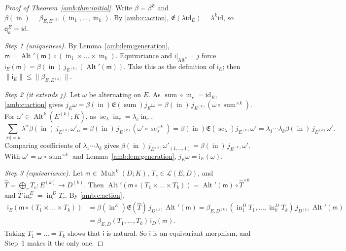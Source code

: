 \documentclass[11pt]{amsart}
\theoremstyle{definition}
\theoremstyle{remark}
\numberwithin{equation}{section}
\newcommand{\cL}{\mathcal L}
\newcommand{\Alt}{\operatorname{Alt}}
\newcommand{\Mult}{\operatorname{Mult}}
\newcommand{\id}{\mathrm{id}}
\newcommand{\abs}[1]{\lvert #1\rvert}
\newcommand{\norm}[1]{\lVert #1\rVert}
\theoremstyle{plain}
\theoremstyle{definition}
\theoremstyle{plain}
\begin{document}
\begin{proof}[Proof of Theorem~\ref{amb:thm:initial}]
Write $\beta=\beta^{\mathfrak E}$ and $\beta(\operatorname{in})=\beta_{E,E^{(k)}}(\operatorname{in}_1,\dots,\operatorname{in}_k)$. By \eqref{amb:c:action}, $\mathfrak E(\lambda\id_E)=\lambda^k\id$, so $\mathsf q_k^E=\id$.

\emph{Step 1 (uniqueness).} By Lemma~\ref{amb:lem:generation}, $\mathsf m=\operatorname{Alt}'(\mathsf m)\circ(\operatorname{in}_1\times\dots\times\operatorname{in}_k)$. Equivariance and $\mathsf i|_{\Alt^k}=j$ force $\mathsf i_E(\mathsf m)=\beta(\operatorname{in})\,j_{E^{(k)}}(\operatorname{Alt}'(\mathsf m))$. Take this as the definition of $\mathsf i_E$; then $\norm{\mathsf i_E}\le\norm{\beta_{E,E^{(k)}}}$.

\emph{Step 2 (it extends $j$).} Let $\omega$ be alternating on $E$. As $\operatorname{sum}\circ\operatorname{in}_c=\id_E$, \eqref{amb:c:action} gives $j_E\omega=\beta(\operatorname{in})\mathfrak E(\operatorname{sum})j_E\omega=\beta(\operatorname{in})\,j_{E^{(k)}}(\omega\circ\operatorname{sum}^{\times k})$. For $\omega'\in\Alt^k(E^{(k)};K)$, as $\operatorname{sc}_\lambda\operatorname{in}_c=\lambda_c\operatorname{in}_c$,
\[
 \sum_{\abs\alpha=k}\lambda^\alpha\beta(\operatorname{in})\,j_{E^{(k)}}\omega'_\alpha=\beta(\operatorname{in})\,j_{E^{(k)}}(\omega'\circ\operatorname{sc}_\lambda^{\times k})=\beta(\operatorname{in})\mathfrak E(\operatorname{sc}_\lambda)j_{E^{(k)}}\omega'=\lambda_1\cdots\lambda_k\beta(\operatorname{in})\,j_{E^{(k)}}\omega'.
\]
Comparing coefficients of $\lambda_1\cdots\lambda_k$ gives $\beta(\operatorname{in})\,j_{E^{(k)}}\omega'_{(1,\dots,1)}=\beta(\operatorname{in})\,j_{E^{(k)}}\omega'$. With $\omega'=\omega\circ\operatorname{sum}^{\times k}$ and Lemma~\ref{amb:lem:generation}, $j_E\omega=\mathsf i_E(\omega)$.

\emph{Step 3 (equivariance).} Let $\mathsf m\in\Mult^k(D;K)$, $T_c\in\cL(E,D)$, and $\widehat T=\bigoplus_cT_c\colon E^{(k)}\to D^{(k)}$. Then $\operatorname{Alt}'(\mathsf m\circ(T_1\times\dots\times T_k))=\operatorname{Alt}'(\mathsf m)\circ\widehat T^{\times k}$ and $\widehat T\operatorname{in}_c^E=\operatorname{in}_c^DT_c$. By \eqref{amb:c:action},
\begin{align*}
 \mathsf i_E(\mathsf m\circ(T_1\times\dots\times T_k))&=\beta(\operatorname{in}^E)\mathfrak E(\widehat T)\,j_{D^{(k)}}\operatorname{Alt}'(\mathsf m)=\beta_{E,D^{(k)}}(\operatorname{in}^D_1T_1,\dots,\operatorname{in}^D_kT_k)\,j_{D^{(k)}}\operatorname{Alt}'(\mathsf m)\\
 &=\beta_{E,D}(T_1,\dots,T_k)\,\mathsf i_D(\mathsf m).
\end{align*}
Taking $T_1=\dots=T_k$ shows that $\mathsf i$ is natural. So $\mathsf i$ is an equivariant morphism, and Step~1 makes it the only one.


\end{proof}
\end{document}
